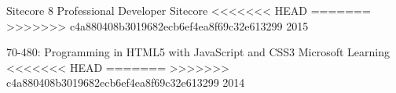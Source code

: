 

\begin{cvhonors}

  \cvhonor
    {Sitecore 8 Professional Developer} %
    {Sitecore} %
<<<<<<< HEAD
    {}
=======
>>>>>>> c4a880408b3019682ecb6ef4ea8f69c32e613299
    {2015} %

  \cvhonor
    {70-480: Programming in HTML5 with JavaScript and CSS3} %
    {Microsoft Learning} %
<<<<<<< HEAD
    {}
=======
>>>>>>> c4a880408b3019682ecb6ef4ea8f69c32e613299
    {2014} %

\end{cvhonors}
